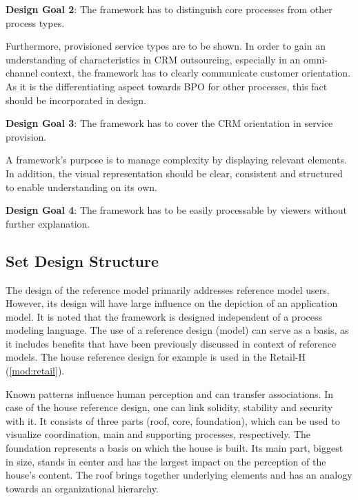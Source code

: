	\hfill\begin{minipage}{\dimexpr\textwidth-1.2cm}
	\textbf{Design Goal 2}: The framework has to distinguish core processes from other process types. 
\end{minipage}

Furthermore, provisioned service types are to be shown. In order to gain an understanding of characteristics in CRM outsourcing, especially in an omni-channel context, the framework has to clearly communicate customer orientation. As it is the differentiating aspect towards BPO for other processes, this fact should be incorporated in design.  

	\hfill\begin{minipage}{\dimexpr\textwidth-1.2cm}
	\textbf{Design Goal 3}: The framework has to cover the CRM orientation in service provision. 
\end{minipage}

A framework's purpose is to manage complexity by displaying relevant elements. In addition, the visual representation should be clear, consistent and structured to enable understanding on its own. 

	\hfill\begin{minipage}{\dimexpr\textwidth-1.2cm}
	\textbf{Design Goal 4}: The framework has to be easily processable by viewers without further explanation. 
\end{minipage}

	\subsection{Set Design Structure}
	
	The design of the reference model primarily addresses reference model users. However, its design will have large influence on the depiction of an application model. It is noted that the framework is designed independent of a process modeling language. The use of a reference design (model) can serve as a basis, as it includes benefits that have been previously discussed in context of reference models. The house reference design for example is used in the Retail-H (\cf \ref{mod:retail}).
	
	Known patterns influence human perception \citep{kroeber1997} and can transfer associations. In case of the house reference design, one can link solidity, stability and security \citep[]{Meise2001} with it. It consists of three parts (roof, core, foundation), which can be used to visualize coordination, main and supporting processes, respectively. The foundation represents a basis on which the house is built. Its main part, biggest in size, stands in center and has the largest impact on the perception of the house's content. The roof brings together underlying elements and has an analogy towards an organizational hierarchy. 
	
